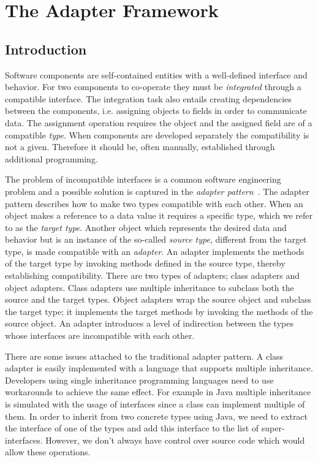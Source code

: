\chapter{The Adapter Framework}

\section{Introduction}
\label{sec:adapter:intro}


Software components are self-contained entities with a well-defined interface and behavior. 
For two components to co-operate they must be \emph{integrated} through a compatible interface. 
The integration task also entails creating dependencies between the components, i.e. assigning objects to fields in order to communicate data.
The assignment operation requires the object and the assigned field are of a compatible \textit{type}.
When components are developed separately the compatibility is not a given. 
Therefore it should be, often manually, established through additional programming. 

The problem of incompatible interfaces is a common software engineering problem and a possible  solution is captured in the \emph{adapter pattern}~\cite{Gamma1995}.
The adapter pattern describes how to make two types compatible with each other. 
When an object makes a reference to a data value it requires a specific type, which we refer to as the \textit{target type}. 
Another object which represents the desired data and behavior but is an instance of the so-called \textit{source type}, different from the target type, is made compatible with an \emph{adapter}.
An adapter implements the methods of the target type by invoking methods defined in the source type, thereby establishing compatibility.
There are two types of adapters; class adapters and object adapters.
Class adapters use multiple inheritance to subclass both the source and the target types.
Object adapters wrap the source object and subclass the target type; it implements the target methods by invoking the methods of the source object.
An adapter introduces a level of indirection between the types whose interfaces are incompatible with each other.

There are some issues attached to the traditional adapter pattern.
A class adapter is easily implemented with a language that supports multiple inheritance. 
Developers using single inheritance programming languages need to use workarounds to achieve the same effect.
For example in Java multiple inheritance is simulated with the usage of interfaces since a class can implement multiple of them. 
In order to inherit from two concrete types using Java, we need to extract the interface of one of the types and add this interface to the list of super-interfaces. 
However, we don't always have control over source code which would allow these operations. 


